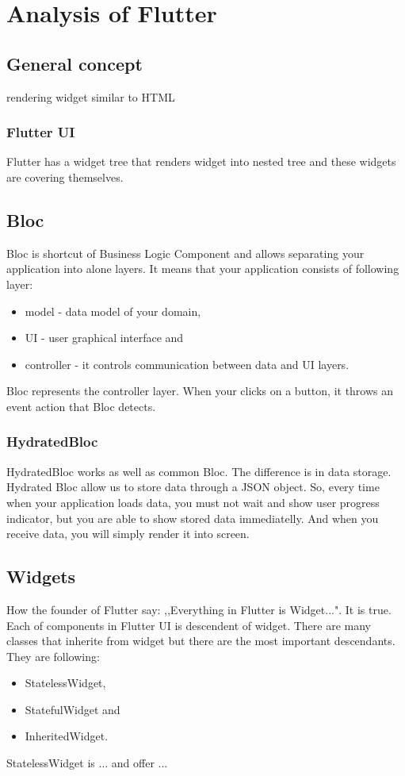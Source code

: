 \chapter{Analysis of Flutter}\label{ch:analysis-of-flutter}

\section{General concept}\label{sec:general-concept}
rendering widget similar to HTML

\subsection{Flutter UI}\label{subsec:flutter-ui}
Flutter has a widget tree that renders widget into nested tree and these widgets are covering themselves.

\section{Bloc}\label{sec:bloc}
Bloc is shortcut of Business Logic Component and allows separating your application into alone layers. It means that your application consists of following layer:
\begin{itemize}
    \item model - data model of your domain,
    \item UI - user graphical interface and 
    \item controller - it controls communication between data and UI layers.
\end{itemize}
Bloc represents the controller layer.
When your clicks on a button, it throws an event action that Bloc detects.

\subsection{HydratedBloc}\label{subsec:hydratedbloc}
HydratedBloc works as well as common Bloc.
The difference is in data storage.
Hydrated Bloc allow us to store data through a JSON object.
So, every time when your application loads data, you must not wait and show user progress indicator, but you are able to show stored data immediatelly.
And when you receive data, you will simply render it into screen.

\section{Widgets}\label{sec:widgets}
How the founder of Flutter say: ,,Everything in Flutter is Widget...".
It is true.
Each of components in Flutter UI is descendent of widget.
There are many classes that inherite from widget but there are the most important descendants.
They are following:
\begin{itemize}
    \item StatelessWidget,
    \item StatefulWidget and
    \item InheritedWidget.
\end{itemize}{}
StatelessWidget is ... and offer ... \cite{statelessWidget}


